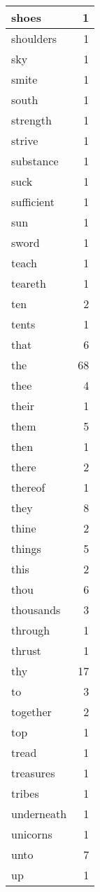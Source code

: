\begin{center}
\begin{longtable}{l|r}
shoes & 1 \\ \hline
shoulders & 1 \\ \hline
sky & 1 \\ \hline
smite & 1 \\ \hline
south & 1 \\ \hline
strength & 1 \\ \hline
strive & 1 \\ \hline
substance & 1 \\ \hline
suck & 1 \\ \hline
sufficient & 1 \\ \hline
sun & 1 \\ \hline
sword & 1 \\ \hline
teach & 1 \\ \hline
teareth & 1 \\ \hline
ten & 2 \\ \hline
tents & 1 \\ \hline
that & 6 \\ \hline
the & 68 \\ \hline
thee & 4 \\ \hline
their & 1 \\ \hline
them & 5 \\ \hline
then & 1 \\ \hline
there & 2 \\ \hline
thereof & 1 \\ \hline
they & 8 \\ \hline
thine & 2 \\ \hline
things & 5 \\ \hline
this & 2 \\ \hline
thou & 6 \\ \hline
thousands & 3 \\ \hline
through & 1 \\ \hline
thrust & 1 \\ \hline
thy & 17 \\ \hline
to & 3 \\ \hline
together & 2 \\ \hline
top & 1 \\ \hline
tread & 1 \\ \hline
treasures & 1 \\ \hline
tribes & 1 \\ \hline
underneath & 1 \\ \hline
unicorns & 1 \\ \hline
unto & 7 \\ \hline
up & 1 \\ \hline

\end{longtable}
\end{center}
